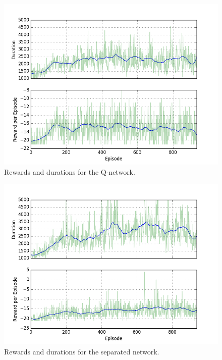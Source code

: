 \documentclass[10pt,a4paper]{article}
\begin{document}
\begin{figure}[!ht]
  \centering
  \includegraphics[width=1\textwidth]{./figures/no_advantage.png}
  \caption{Rewards and durations for the Q-network.}
  \label{fig:no_advantage}
\end{figure}

\begin{figure}[!ht]
  \centering
  \includegraphics[width=1\textwidth]{./figures/tanh_corrected_features.png}
  \caption{Rewards and durations for the separated network.}
  \label{fig:with_advantage}
\end{figure}
\end{document}
